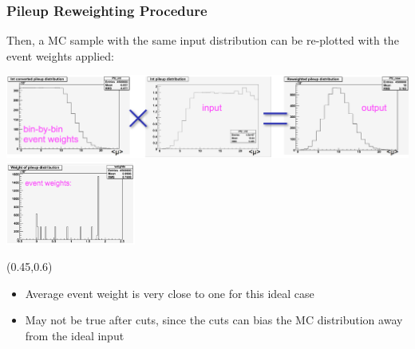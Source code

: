 \begin{frame}[t]\frametitle{Pileup Reweighting Procedure}
	\vspace*{-0.35cm}
	\begin{exampleblock}{}
		Then, a MC sample with the same input distribution can be re-plotted with the event weights applied:
	\end{exampleblock}
	\vspace*{0.25cm}
	\includegraphics[width=\textwidth]{images/pileup_reweighting/pr_4.png}\\
	\vspace*{0.25cm}
	\hspace*{1.5cm}\includegraphics[width=0.32\textwidth]{images/pileup_reweighting/pr_5.png}
	\begin{textblock}{0.5}(0.45,0.6)
		\begin{itemize}
			\item Average event weight is very close to one for this ideal case
			\item May not be true after cuts, since the cuts can bias the MC distribution away from the ideal input
		\end{itemize}
	\end{textblock}
\end{frame}